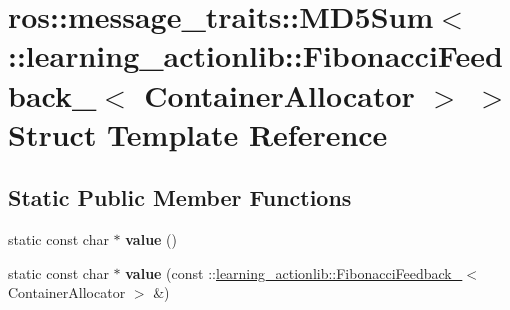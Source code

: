 \hypertarget{structros_1_1message__traits_1_1MD5Sum_3_01_1_1learning__actionlib_1_1FibonacciFeedback___3_01ContainerAllocator_01_4_01_4}{}\section{ros\+:\+:message\+\_\+traits\+:\+:M\+D5\+Sum$<$ \+:\+:learning\+\_\+actionlib\+:\+:Fibonacci\+Feedback\+\_\+$<$ Container\+Allocator $>$ $>$ Struct Template Reference}
\label{structros_1_1message__traits_1_1MD5Sum_3_01_1_1learning__actionlib_1_1FibonacciFeedback___3_01ContainerAllocator_01_4_01_4}
\subsection*{Static Public Member Functions}
\begin{DoxyCompactItemize}
\item 
\mbox{\label{structros_1_1message__traits_1_1MD5Sum_3_01_1_1learning__actionlib_1_1FibonacciFeedback___3_01ContainerAllocator_01_4_01_4_a539c3fc7f657fe1adb1ba32ab79a6d90}} 
static const char $\ast$ {\bfseries value} ()
\item 
\mbox{\label{structros_1_1message__traits_1_1MD5Sum_3_01_1_1learning__actionlib_1_1FibonacciFeedback___3_01ContainerAllocator_01_4_01_4_a35529372f370190ad8c6fc8016d268f8}} 
static const char $\ast$ {\bfseries value} (const \+::\hyperlink{structlearning__actionlib_1_1FibonacciFeedback__}{learning\+\_\+actionlib\+::\+Fibonacci\+Feedback\+\_\+}$<$ Container\+Allocator $>$ \&)
\end{DoxyCompactItemize}
